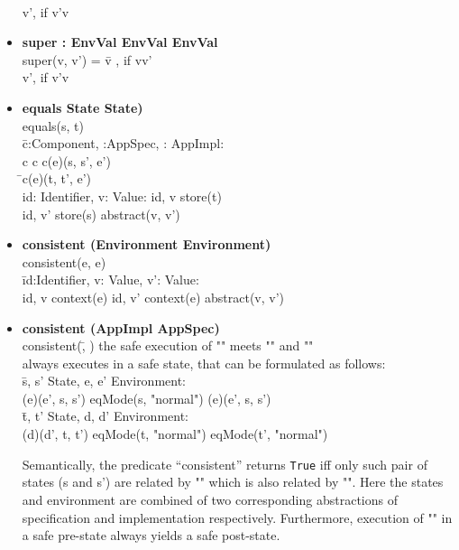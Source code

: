 \documentclass[conference]{IEEEtran}
\begin{document}
\begin{itemize}
\begin{tabbing}
\\\> v', if \textlbrackdbl v'\textrbrackdbl  \textlbrackdbl v\textrbrackdbl
\end{tabbing}
\item \begin{tabbing}\textbf{super : EnvVal  EnvVal  EnvVal}
\\super(v, v') = \= v	, if \textlbrackdbl v\textrbrackdbl  \textlbrackdbl v'\textrbrackdbl
\\\> v', if \textlbrackdbl v'\textrbrackdbl  \textlbrackdbl v\textrbrackdbl
\end{tabbing}
\item \begin{tabbing}\textbf{equals  State  State)}
\\equals(s, t) 
\\  \=c:Component, :AppSpec, : AppImpl: 
\\\>c    c    \textlbrackdbl c\textrbrackdbl(e)(s, s', e') 
\\ \=\textlbrackdbl c\textrbrackdbl(e)(t, t', e')  \\\> id: Identifier, v: Value: 
id, v  store(t) 
\\\>
id, v'  store(s)  abstract(v, v')
\end{tabbing}
\item \begin{tabbing}\textbf{consistent  (Environment  Environment)}
\\consistent(e, e) 
\\  \=id:Identifier, v: Value, v': Value: 
\\\>id, v  context(e)  id, v'  context(e)  abstract(v, v')
\end{tabbing}
\item \begin{tabbing}\textbf{consistent  (AppImpl  AppSpec)}
\\consistent(\=, )  the safe execution of "" meets "" and "" 
\\always executes in a safe state, that can be formulated as follows:
\\  \=s, s'  State, e, e'  Environment: 
\\\>\textlbrackdbl \textrbrackdbl(e)(e', s, s')  eqMode(s, "normal")  \textlbrackdbl \textrbrackdbl(e)(e', s, s') 
\\ \=t, t'  State, d, d'  Environment: 
\\\>\textlbrackdbl \textrbrackdbl(d)(d', t, t')  eqMode(t, "normal")  eqMode(t', "normal")
\end{tabbing}
Semantically, the predicate ``consistent'' returns \texttt{True} iff only such pair of states (s and s') are related by "" which is also related by "". Here the states and environment are combined of two corresponding abstractions of specification and implementation respectively. Furthermore, execution of "" in a safe pre-state always yields a safe post-state.

\end{itemize}
\end{document}
